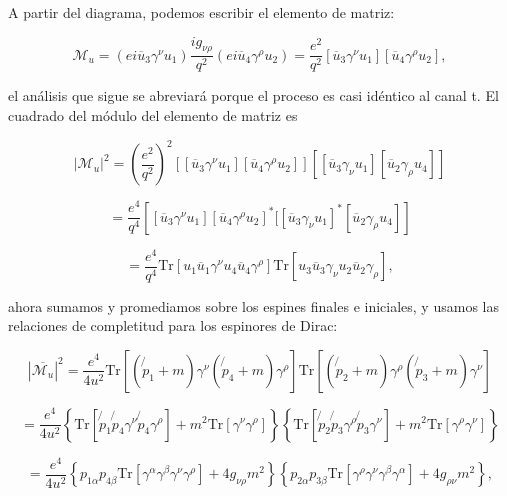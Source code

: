 A partir del diagrama, podemos escribir el elemento de matriz:

\begin{equation}
\mathcal{M}_u = (ei\overline{u}_3\gamma^\nu u_1) \frac{ig_{\nu\rho}}{q^2} (ei\overline{u}_4\gamma^\rho u_2) = \frac{e^2}{q^2} [\overline{u}_3\gamma^\nu u_1][\overline{u}_4\gamma^\rho u_2],
\end{equation}

el análisis que sigue se abreviará porque el proceso es casi idéntico al canal t. El cuadrado del módulo del elemento de matriz es

\begin{equation}
|\mathcal{M}_u|^2 = \left( \frac{e^2}{q^2} \right)^2 \left[ [\overline{u}_3\gamma^\nu u_1][\overline{u}_4\gamma^\rho u_2] \right]\left[[\overline{u}_3\gamma_\nu u_1][\overline{u}_2\gamma_\rho u_4]\right]
\end{equation}

\begin{equation}
= \frac{e^4}{q^4} \left[ [\overline{u}_3\gamma^\nu u_1][\overline{u}_4\gamma^\rho u_2]^*[ [\overline{u}_3\gamma_\nu u_1]^*[\overline{u}_2\gamma_\rho u_4] \right]
\end{equation}

\begin{equation}
= \frac{e^4}{q^4} \text{Tr}[u_1\overline{u}_1\gamma^\nu u_4\overline{u}_4\gamma^\rho] \text{Tr}[u_3\overline{u}_3\gamma_\nu u_2\overline{u}_2\gamma_\rho],
\end{equation}

ahora sumamos y promediamos sobre los espines finales e iniciales, y usamos las relaciones de completitud para los espinores de Dirac:

\begin{equation}
|\overline{\mathcal{M}_u}|^2 = \frac{e^4}{4u^2} \text{Tr}[(\not{p}_1 + m)\gamma^\nu (\not{p}_4 + m)\gamma^\rho] \text{Tr}[(\not{p}_2 + m)\gamma^\rho (\not{p}_3 + m)\gamma^\nu]
\end{equation}

\begin{equation}
= \frac{e^4}{4u^2} \left\{ \text{Tr} \left[ \not{p}_1 \not{p}_4 \gamma^\nu \not{p}_4 \gamma^\rho \right] + m^2 \text{Tr}[\gamma^\nu\gamma^\rho] \right\} \left\{ \text{Tr} \left[ \not{p}_2 \not{p}_3 \gamma^\rho \not{p}_3 \gamma^\nu \right] + m^2 \text{Tr}[\gamma^\rho\gamma^\nu] \right\}
\end{equation}

\begin{equation}
= \frac{e^4}{4u^2} \left\{ p_{1\alpha}p_{4\beta} \text{Tr}[\gamma^\alpha\gamma^\beta\gamma^\nu\gamma^\rho] + 4g_{\nu\rho}m^2 \right\} \left\{ p_{2\alpha}p_{3\beta} \text{Tr}[\gamma^\rho\gamma^\nu\gamma^\beta\gamma^\alpha] + 4g_{\rho\nu}m^2 \right\},
\end{equation}

